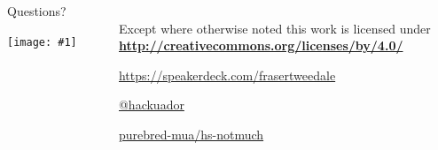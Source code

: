 \documentclass[ignorenonframetext,aspectratio=169]{beamer}
\newcommand{\includegraphicsscaled}[1]{
    \texttt{[image: \#1]}
}
\begin{document}
\begin{frame}[plain]
\begin{columns}

  \begin{column}{.4\textwidth}
    \begin{center}
    {
        \Large Questions?\\
        \medskip
        \includegraphicsscaled{sailor-victim.jpg}
    }
    \end{center}


  \end{column}

  \begin{column}{.6\textwidth}
    \hypersetup{urlcolor=black}

    \setlength{\parskip}{.5em}

    { \centering

    
    \\
    { \scriptsize
    Except where otherwise noted this work is licensed under
    }\\
    { \footnotesize
      \textbf{\url{http://creativecommons.org/licenses/by/4.0/}}
    }

    \bigskip
    \large \tt

    \url{https://speakerdeck.com/frasertweedale}

    \href{https://twitter.com/hackuador}{@hackuador}

    \href{https://github.com/purebred-mua/hs-notmuch}{purebred-mua/hs-notmuch}

    }
  \end{column}

\end{columns}
\end{frame}
\end{document}
